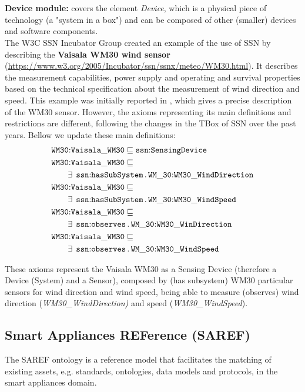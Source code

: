 \documentclass{sig-alternate-05-2015}
\newcommand{\erestr}[2]{\exists\;\,{\tt #1}\,.\,{\tt #2}}
\begin{document}
\\\\\textbf{Device module:} covers the element \textit{Device}, which is a physical piece of technology (a "system in a box") and can be composed of other (smaller) devices and software components.\\
 
The W3C SSN Incubator Group created an example of the use of SSN by describing the \textbf{Vaisala WM30 wind sensor} (\url{https://www.w3.org/2005/Incubator/ssn/ssnx/meteo/WM30.html}). It describes the measurement capabilities, power supply and operating and survival properties based on the technical specification about the measurement of wind direction and speed. This example was initially reported in \cite{Compton2009}, which gives a precise description of the WM30 sensor. However, the axioms representing its main definitions and restrictions are different, following the changes in the TBox of SSN over the past years. Bellow we update these main definitions:
\begin{align*}
  \begin{aligned}
	&\node{WM30}{Vaisala\_WM30} \sqsubseteq \node{ssn}{SensingDevice}\\
	&\node{WM30}{Vaisala\_WM30} \sqsubseteq\\
	&\qquad\erestr{\node{ssn}{hasSubSystem}}{\node{WM\_30}{WM30\_WindDirection}}\\
	&\node{WM30}{Vaisala\_WM30} \sqsubseteq\\
	&\qquad\erestr{\node{ssn}{hasSubSystem}}{\node{WM\_30}{WM30\_WindSpeed}}\\	
	&\node{WM30}{Vaisala\_WM30} \sqsubseteq\\
	&\qquad\erestr{\node{ssn}{observes}}{\node{WM\_30}{WM30\_WinDirection}}\\
	&\node{WM30}{Vaisala\_WM30} \sqsubseteq\\
	&\qquad\erestr{\node{ssn}{observes}}{\node{WM\_30}{WM30\_WindSpeed}}\\
  \end{aligned}\\
\end{align*}

These axioms represent the Vaisala WM30 as a Sensing Device (therefore a Device (System) and a Sensor), composed by (has subsystem) WM30 particular sensors for wind direction and wind speed, being able to measure (observes) wind direction (\textit{WM30\_WindDirection)} and speed (\textit{WM30\_WindSpeed}). 

\subsection{Smart Appliances REFerence (SAREF)}
The SAREF ontology \cite{Daniele2015,Daniele2016} is a reference model that facilitates the matching of existing assets, e.g. standards, ontologies, data models and protocols, in the smart appliances domain. 
\end{document}
